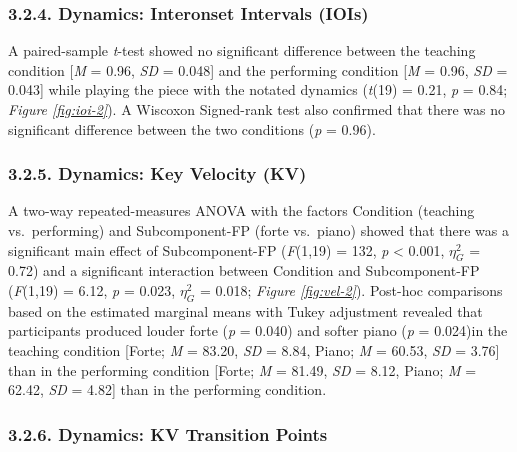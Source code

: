\documentclass[
  english,
  man,floatsintext]{apa6}
\begin{document}
\hypertarget{dynamics-interonset-intervals-iois-1}{%
\subsubsection{3.2.4. Dynamics: Interonset Intervals (IOIs)}\label{dynamics-interonset-intervals-iois-1}}

A paired-sample \emph{t}-test showed no significant difference between the teaching condition {[}\emph{M} = 0.96, \emph{SD} = 0.048{]} and the performing condition {[}\emph{M} = 0.96, \emph{SD} = 0.043{]} while playing the piece with the notated dynamics (\emph{t}(19) = 0.21, \emph{p} = 0.84; \emph{Figure \ref{fig:ioi-2}}). A Wiscoxon Signed-rank test also confirmed that there was no significant difference between the two conditions (\emph{p} = 0.96).

\hypertarget{dynamics-key-velocity-kv-1}{%
\subsubsection{3.2.5. Dynamics: Key Velocity (KV)}\label{dynamics-key-velocity-kv-1}}

A two-way repeated-measures ANOVA with the factors Condition (teaching vs.~performing) and Subcomponent-FP (forte vs.~piano) showed that there was a significant main effect of Subcomponent-FP (\emph{F}(1,19) = 132, \emph{p} \textless{} 0.001, \(\eta_G^2\) = 0.72) and a significant interaction between Condition and Subcomponent-FP (\emph{F}(1,19) = 6.12, \emph{p} = 0.023, \(\eta_G^2\) = 0.018; \emph{Figure \ref{fig:vel-2}}). Post-hoc comparisons based on the estimated marginal means with Tukey adjustment revealed that participants produced louder forte (\emph{p} = 0.040) and softer piano (\emph{p} = 0.024)in the teaching condition {[}Forte; \emph{M} = 83.20, \emph{SD} = 8.84, Piano; \emph{M} = 60.53, \emph{SD} = 3.76{]} than in the performing condition {[}Forte; \emph{M} = 81.49, \emph{SD} = 8.12, Piano; \emph{M} = 62.42, \emph{SD} = 4.82{]} than in the performing condition.

\hypertarget{dynamics-kv-transition-points-1}{%
\subsubsection{3.2.6. Dynamics: KV Transition Points}\label{dynamics-kv-transition-points-1}}
\end{document}
